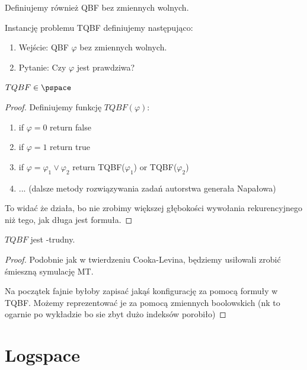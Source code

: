 \begin{definition}
	Definiujemy również QBF bez zmiennych wolnych.
\end{definition}

\begin{definition}
	Instancję problemu TQBF definiujemy następująco:

	\begin{enumerate}
		\item Wejście: QBF \( \varphi \) bez zmiennych wolnych.
		\item Pytanie: Czy \( \varphi \) jest prawdziwa?
	\end{enumerate}
\end{definition}

\begin{lemma}
	\( TQBF \in \pspace \)
\end{lemma}

\begin{proof}

	Definiujemy funkcję \( TQBF(\varphi) \):
	\begin{enumerate}
		\item if \(\varphi = 0\) return false
		\item if \(\varphi = 1\) return true
		\item if \( \varphi = \varphi_1 \lor \varphi_2 \) return TQBF(\(\varphi_1\)) or TQBF(\(\varphi_2\))
		\item ... (dalsze metody rozwiązywania zadań autorstwa generała Napałowa)
	\end{enumerate}

	To widać że działa, bo nie zrobimy większej głębokości wywołania rekurencyjnego niż tego, jak długa jest formuła.
\end{proof}

\begin{lemma}
	\(TQBF\) jest \pspace-trudny.
\end{lemma}
\begin{proof}
	Podobnie jak w twierdzeniu Cooka-Levina, będziemy usiłowali zrobić śmieszną symulację MT.

	Na początek fajnie byłoby zapisać jakąś konfigurację za pomocą formuły w TQBF. Możemy reprezentować je za pomocą zmiennych boolowskich (nk to ogarnie po wykładzie bo sie zbyt dużo indeksów porobiło)
\end{proof}


\section{Logspace}

